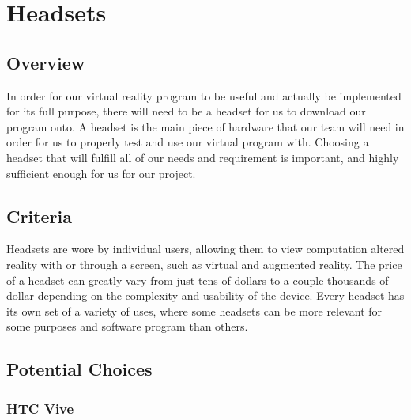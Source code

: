 \documentclass[letterpaper,10pt,onecolumn,compsoc]{IEEEtran}
\begin{document}
\newpage

\section{Headsets}
\subsection{Overview}

\noindent
In order for our virtual reality program to be useful and actually be implemented for its full purpose, there will need to be a headset for us to download our program onto. A headset is the main piece of hardware that our team will need in order for us to properly test and use our virtual program with. Choosing a headset that will fulfill all of our needs and requirement is important, and highly sufficient enough for us for our project.

\subsection{Criteria}


\noindent
Headsets are wore by individual users, allowing them to view computation altered reality with or through a screen, such as virtual and augmented reality. The price of a headset can greatly vary from just tens of dollars to a couple thousands of dollar depending on the complexity and usability of the device. Every headset has its own set of a variety of uses, where some headsets can be more relevant for some purposes and software program than others.

\subsection{Potential Choices}
\subsubsection{HTC Vive}

\end{document}

